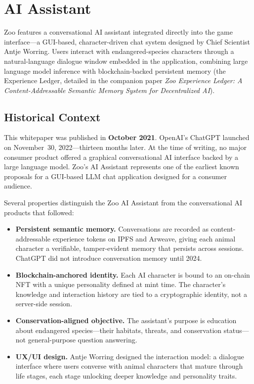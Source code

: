 \section{AI Assistant}
\label{sec:ai-assistant}

Zoo features a conversational AI assistant integrated directly into the game interface---a GUI-based, character-driven chat system designed by Chief Scientist Antje Worring. Users interact with endangered-species characters through a natural-language dialogue window embedded in the application, combining large language model inference with blockchain-backed persistent memory (the Experience Ledger, detailed in the companion paper \emph{Zoo Experience Ledger: A Content-Addressable Semantic Memory System for Decentralized AI}).

\subsection{Historical Context}

This whitepaper was published in \textbf{October 2021}. OpenAI's ChatGPT launched on November~30, 2022---thirteen months later. At the time of writing, no major consumer product offered a graphical conversational AI interface backed by a large language model. Zoo's AI Assistant represents one of the earliest known proposals for a GUI-based LLM chat application designed for a consumer audience.

Several properties distinguish the Zoo AI Assistant from the conversational AI products that followed:

\begin{itemize}[nosep]
    \item \textbf{Persistent semantic memory.} Conversations are recorded as content-addressable experience tokens on IPFS and Arweave, giving each animal character a verifiable, tamper-evident memory that persists across sessions. ChatGPT did not introduce conversation memory until 2024.
    \item \textbf{Blockchain-anchored identity.} Each AI character is bound to an on-chain NFT with a unique personality defined at mint time. The character's knowledge and interaction history are tied to a cryptographic identity, not a server-side session.
    \item \textbf{Conservation-aligned objective.} The assistant's purpose is education about endangered species---their habitats, threats, and conservation status---not general-purpose question answering.
    \item \textbf{UX/UI design.} Antje Worring designed the interaction model: a dialogue interface where users converse with animal characters that mature through life stages, each stage unlocking deeper knowledge and personality traits.
\end{itemize}

